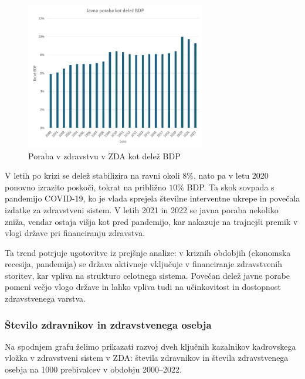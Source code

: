 \documentclass[12pt,a4paper]{article}
\theoremstyle{definition}
\begin{document}
\begin{figure}[htbp]
    \centering
    \includegraphics[width=0.7\textwidth]{zda_poraba_delez_BDP.png}
    \caption{Poraba v zdravstvu v ZDA kot delež BDP}
    \label{fig:zda_poraba_delez_BDP}
\end{figure}

V letih po krizi se delež stabilizira na ravni okoli $8\%$, nato pa v letu 2020 
ponovno izrazito poskoči, tokrat na približno $10\%$ BDP. Ta skok sovpada s pandemijo COVID-19, 
ko je vlada sprejela številne interventne ukrepe in povečala izdatke za zdravstveni sistem. 
V letih 2021 in 2022 se javna poraba nekoliko zniža, vendar ostaja višja kot pred pandemijo, 
kar nakazuje na trajnejši premik v vlogi države pri financiranju zdravstva.

Ta trend potrjuje ugotovitve iz prejšnje analize: v kriznih obdobjih (ekonomska recesija, pandemija) 
se država aktivneje vključuje v financiranje zdravstvenih storitev, kar vpliva na strukturo celotnega sistema. 
Povečan delež javne porabe pomeni večjo vlogo države in lahko vpliva tudi na učinkovitost in dostopnost zdravstvenega varstva.

\subsubsection{Število zdravnikov in zdravstvenega osebja}

Na spodnjem grafu želimo prikazati razvoj dveh ključnih kazalnikov kadrovskega vložka v zdravstveni sistem v ZDA: 
števila zdravnikov in števila zdravstvenega osebja na 1000 prebivalcev v obdobju 2000–2022.
\end{document}
